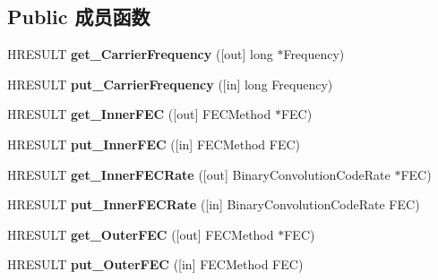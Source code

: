 \subsection*{Public 成员函数}
\begin{DoxyCompactItemize}
\item 
\mbox{\label{interface_i_locator_a8f9825dde8d884f49cb562976b71adf9}} 
H\+R\+E\+S\+U\+LT {\bfseries get\+\_\+\+Carrier\+Frequency} (\mbox{[}out\mbox{]} long $\ast$Frequency)
\item 
\mbox{\label{interface_i_locator_a278283e50e991ccff3bbeb0a1065e5db}} 
H\+R\+E\+S\+U\+LT {\bfseries put\+\_\+\+Carrier\+Frequency} (\mbox{[}in\mbox{]} long Frequency)
\item 
\mbox{\label{interface_i_locator_a01224be6eb637bff691d47158f50d20d}} 
H\+R\+E\+S\+U\+LT {\bfseries get\+\_\+\+Inner\+F\+EC} (\mbox{[}out\mbox{]} F\+E\+C\+Method $\ast$F\+EC)
\item 
\mbox{\label{interface_i_locator_a853f385e741966944fb9d36dba217271}} 
H\+R\+E\+S\+U\+LT {\bfseries put\+\_\+\+Inner\+F\+EC} (\mbox{[}in\mbox{]} F\+E\+C\+Method F\+EC)
\item 
\mbox{\label{interface_i_locator_a68ec8877fa17be66ab2202bb6112fdd8}} 
H\+R\+E\+S\+U\+LT {\bfseries get\+\_\+\+Inner\+F\+E\+C\+Rate} (\mbox{[}out\mbox{]} Binary\+Convolution\+Code\+Rate $\ast$F\+EC)
\item 
\mbox{\label{interface_i_locator_abb1e85b9f563d426c993fd5cb95f0512}} 
H\+R\+E\+S\+U\+LT {\bfseries put\+\_\+\+Inner\+F\+E\+C\+Rate} (\mbox{[}in\mbox{]} Binary\+Convolution\+Code\+Rate F\+EC)
\item 
\mbox{\label{interface_i_locator_ad0e0c8bdaf55a412f9538126f6ee67c8}} 
H\+R\+E\+S\+U\+LT {\bfseries get\+\_\+\+Outer\+F\+EC} (\mbox{[}out\mbox{]} F\+E\+C\+Method $\ast$F\+EC)
\item 
\mbox{\label{interface_i_locator_ac9dfcb5823e0118935e17cf7165fdcb0}} 
H\+R\+E\+S\+U\+LT {\bfseries put\+\_\+\+Outer\+F\+EC} (\mbox{[}in\mbox{]} F\+E\+C\+Method F\+EC)
\item 

\end{DoxyCompactItemize}

